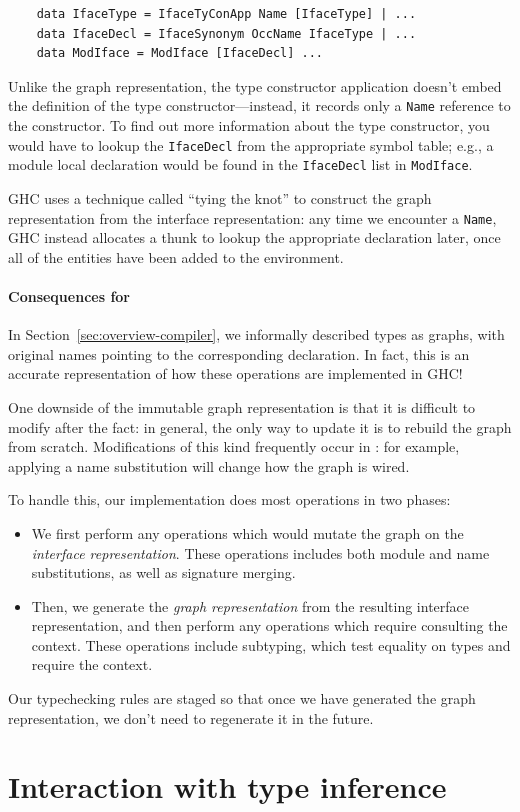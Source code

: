 \begin{lstlisting}
    data IfaceType = IfaceTyConApp Name [IfaceType] | ...
    data IfaceDecl = IfaceSynonym OccName IfaceType | ...
    data ModIface = ModIface [IfaceDecl] ...
\end{lstlisting}

\noindent
Unlike the graph representation, the type constructor application
doesn't embed the definition of the type constructor---instead,
it records only a \verb|Name| reference to the constructor. To find out
more information about the type constructor, you would have to lookup
the \verb|IfaceDecl| from the appropriate symbol table; e.g., a module
local declaration would be found in the \verb|IfaceDecl| list in
\verb|ModIface|.

GHC uses a technique called ``tying the knot''
to construct the graph representation from the interface
representation: any time we encounter a \verb|Name|, GHC instead
allocates a thunk to lookup the appropriate declaration later,
once all of the entities have been added to the environment.

\paragraph{Consequences for \Backpack{}}
In Section~\ref{sec:overview-compiler}, we informally described
types as graphs, with original names pointing to the corresponding
declaration.  In fact, this is an accurate representation of how
these operations are implemented in GHC\@!

One downside of the immutable graph representation is that it is
difficult to modify after the fact: in general, the only way to update
it is to rebuild the graph from scratch.  Modifications of this kind
frequently occur in \Backpack{}: for example, applying a name
substitution will change how the graph is wired.

To handle this, our implementation does most operations in two
phases:

\begin{itemize}
    \item We first perform any operations which would
    mutate the graph on the \emph{interface representation}.
    These operations includes both module and name substitutions, as well
    as signature merging.
    \item Then, we generate the \emph{graph representation} from
    the resulting interface representation, and then perform any
    operations which require consulting the context.  These
    operations include subtyping, which test equality on types
    and require the context.
\end{itemize}
%
Our typechecking rules are staged so that once we have generated the
graph representation, we don't need to regenerate it in the future.

\section{Interaction with type inference}


